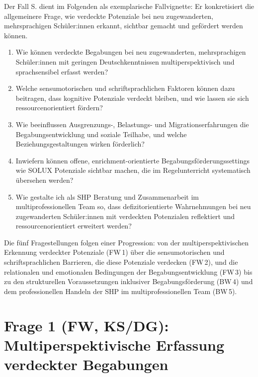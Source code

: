 \documentclass[ngerman, a4paper]{article}
\begin{document}
Der Fall S. dient im Folgenden als exemplarische Fallvignette: Er konkretisiert
die allgemeinere Frage, wie verdeckte Potenziale bei neu zugewanderten,
mehrsprachigen Schüler:innen erkannt, sichtbar gemacht und gefördert werden
können.

\begin{enumerate}
  \item[\textbf{FW\,1 (KS/DG)}] Wie können verdeckte Begabungen bei neu
    zugewanderten, mehrsprachigen Schüler:innen mit geringen Deutschkenntnissen
    multiperspektivisch und sprachsensibel erfasst werden?
  \item[\textbf{FW\,2 (MW/KS)}] Welche sensumotorischen und schriftsprachlichen
    Faktoren können dazu beitragen, dass kognitive Potenziale verdeckt bleiben,
    und wie lassen sie sich ressourcenorientiert fördern?
  \item[\textbf{FW\,3 (PB)}] Wie beeinflussen Ausgrenzungs-, Belastungs- und
    Migrationserfahrungen die Begabungsentwicklung und soziale Teilhabe, und
    welche Beziehungsgestaltungen wirken förderlich?
  \item[\textbf{BW\,4 (DG/PV)}] Inwiefern können offene, enrichment-orientierte
    Begabungsförderungssettings wie SOLUX Potenziale sichtbar machen, die im
    Regelunterricht systematisch übersehen werden?
  \item[\textbf{BW\,5 (ZB/PV)}] Wie gestalte ich als SHP Beratung und
    Zusammenarbeit im multiprofessionellen Team so, dass defizitorientierte
    Wahrnehmungen bei neu zugewanderten Schüler:innen mit verdeckten Potenzialen
    reflektiert und ressourcenorientiert erweitert werden?
\end{enumerate}

Die fünf Fragestellungen folgen einer Progression: von der multiperspektivischen
Erkennung verdeckter Potenziale (FW\,1) über die sensumotorischen und
schriftsprachlichen Barrieren, die diese Potenziale verdecken (FW\,2), und die
relationalen und emotionalen Bedingungen der Begabungsentwicklung (FW\,3) bis
zu den strukturellen Voraussetzungen inklusiver Begabungsförderung (BW\,4) und
dem professionellen Handeln der SHP im multiprofessionellen Team (BW\,5).

\newpage
 
\section{Frage 1 (FW, KS/DG): Multiperspektivische Erfassung verdeckter Begabungen}
\label{sec:frage1}
 
\end{document}
